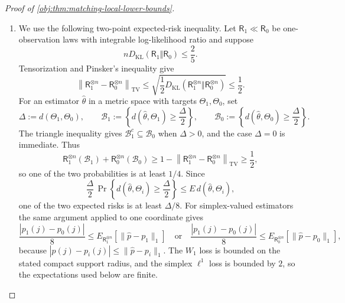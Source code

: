 \begin{proof}[Proof of \cref{obj:thm:matching-local-lower-bounds}]
\begin{enumerate}
\[\le
\sum_{\zeta}\frac{(\mathfrak r(\zeta)-\mathfrak s(\zeta))^2}{\mathfrak s(\zeta)}
\]
whenever \(\mathfrak r\) and \(\mathfrak s\) are probability vectors on a finite carrier and
\(\mathfrak s(\zeta)>0\) for every \(\zeta\); this follows from \(\log x\le x-1\).  Therefore
\[
D_{\mathrm{KL}}\!\left((P_{\varepsilon}^{\mathrm{wit}})_O\Vert(P_0^{\mathrm{wit}})_O\right)
\le
\sum_{\zeta\in\Omega_{\mathrm{vis}}}
\frac{\{\psi^{\mathrm{wit}}_{\varepsilon}(\zeta)-\psi^{\mathrm{wit}}_{0}(\zeta)\}^2}
{\psi^{\mathrm{wit}}_{0}(\zeta)}
\le
16\cdot1000\,\varepsilon^2
=
16000\varepsilon^2,
\]
where the first inequality also uses data processing under \(\phi\).  Taking
\(\varepsilon=\varepsilon_n\), \cref{obj:prop:two-class-witness-valid} gives
\(P_0^{\mathrm{wit}},P_{\varepsilon_n}^{\mathrm{wit}}\in\mathcal M\), and the displayed KL bound places both laws in \(\mathcal L_n^\nu\) from \cref{obj:def:local-quotient-experiment}. %

\item We use the following two-point expected-risk inequality.  Let \(\mathsf R_1\ll\mathsf R_0\) be one-observation laws with integrable log-likelihood ratio and suppose
\[
nD_{\mathrm{KL}}(\mathsf R_1\Vert\mathsf R_0)\le\frac25 .
\]
Tensorization and Pinsker's inequality give
\[
\left\|\mathsf R_1^{\otimes n}-\mathsf R_0^{\otimes n}\right\|_{\mathrm{TV}}
\le
\sqrt{\frac12D_{\mathrm{KL}}(\mathsf R_1^{\otimes n}\Vert\mathsf R_0^{\otimes n})}
\le\frac12 .
\]
For an estimator \(\widehat\theta\) in a metric space with targets \(\Theta_1,\Theta_0\), set
\[
\Delta:=d(\Theta_1,\Theta_0),
\qquad
\mathcal B_1:=\left\{d(\widehat\theta,\Theta_1)\ge\frac{\Delta}{2}\right\},
\qquad
\mathcal B_0:=\left\{d(\widehat\theta,\Theta_0)\ge\frac{\Delta}{2}\right\}.
\]
The triangle inequality gives \(\mathcal B_1^{c}\subseteq\mathcal B_0\) when \(\Delta>0\), and the case \(\Delta=0\) is immediate.  Thus
\[
\mathsf R_1^{\otimes n}(\mathcal B_1)+\mathsf R_0^{\otimes n}(\mathcal B_0)
\ge
1-\left\|\mathsf R_1^{\otimes n}-\mathsf R_0^{\otimes n}\right\|_{\mathrm{TV}}
\ge\frac12,
\]
so one of the two probabilities is at least \(1/4\).  Since
\[
\frac{\Delta}{2}\,\Pr\!\left\{d(\widehat\theta,\Theta_i)\ge\frac{\Delta}{2}\right\}
\le
E\,d(\widehat\theta,\Theta_i),
\]
one of the two expected risks is at least \(\Delta/8\).  For simplex-valued estimators the same argument applied to one coordinate gives
\[
\frac{|p_1(j)-p_0(j)|}{8}
\le
E_{\mathsf R_1^{\otimes n}}\!\left[\|\widehat p-p_1\|_1\right]
\quad\text{or}\quad
\frac{|p_1(j)-p_0(j)|}{8}
\le
E_{\mathsf R_0^{\otimes n}}\!\left[\|\widehat p-p_0\|_1\right],
\]
because \(|\widehat p(j)-p_i(j)|\le\|\widehat p-p_i\|_1\).  The \(W_1\) loss is bounded on the stated compact support radius, and the simplex \(\ell^1\) loss is bounded by \(2\), so the expectations used below are finite. %


\end{enumerate}
\end{proof}
